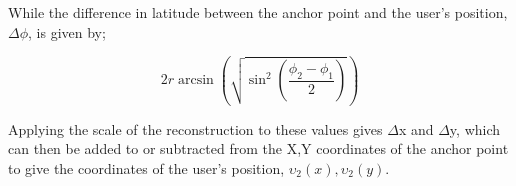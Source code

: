 While the difference in latitude between the anchor point and the user's position, $\Delta\phi$, is given by;

\begin{equation}
2r \arcsin\left( \sqrt{\sin^{2} \left( \frac{\phi_{2} - \phi_{1}}{2}\right)} \right)
\end{equation}

Applying the scale of the reconstruction to these values gives $\Delta$x and $\Delta$y, which can then be added to or subtracted from the X,Y coordinates of the anchor point to give the coordinates of the user's position, $\upsilon_{2}(x),\upsilon_{2}(y)$.




